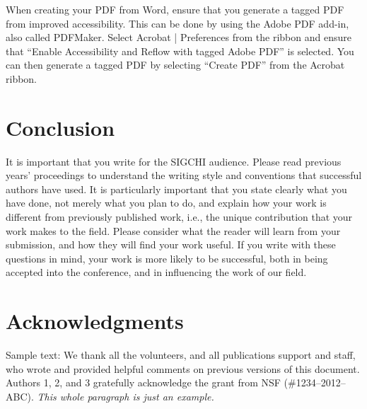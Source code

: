 \documentclass{sigchi}
\begin{document}
When creating your PDF from Word, ensure that you generate a tagged
PDF from improved accessibility. This can be done by using the Adobe
PDF add-in, also called PDFMaker. Select Acrobat | Preferences from
the ribbon and ensure that ``Enable Accessibility and Reflow with
tagged Adobe PDF'' is selected. You can then generate a tagged PDF by
selecting ``Create PDF'' from the Acrobat ribbon.

\section{Conclusion}

It is important that you write for the SIGCHI audience. Please read
previous years' proceedings to understand the writing style and
conventions that successful authors have used. It is particularly
important that you state clearly what you have done, not merely what
you plan to do, and explain how your work is different from previously
published work, i.e., the unique contribution that your work makes to
the field. Please consider what the reader will learn from your
submission, and how they will find your work useful. If you write with
these questions in mind, your work is more likely to be successful,
both in being accepted into the conference, and in influencing the
work of our field.

\section{Acknowledgments}

Sample text: We thank all the volunteers, and all publications support
and staff, who wrote and provided helpful comments on previous
versions of this document. Authors 1, 2, and 3 gratefully acknowledge
the grant from NSF (\#1234--2012--ABC). \textit{This whole paragraph is
  just an example.}

%
%
%
%
%
\balance{}
\end{document}
